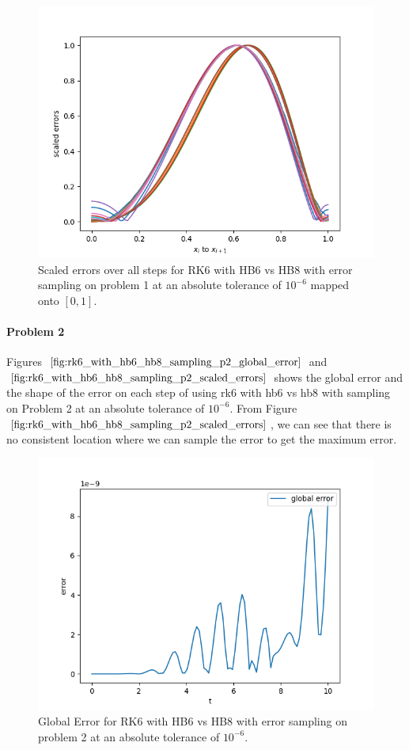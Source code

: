 \begin{figure}[H]
\centering
\includegraphics[width=0.7\linewidth]{./figures/rk6_with_hb6_hb8_sampling_p1_scaled_errors}
\caption{Scaled errors over all steps for RK6 with HB6 vs HB8 with error sampling on problem 1 at an absolute tolerance of $10^{-6}$ mapped onto $[0, 1]$.}
\label{fig:rk6_with_hb6_hb8_sampling_p1_scaled_errors}
\end{figure}

\paragraph{Problem 2} Figures $\ref{fig:rk6_with_hb6_hb8_sampling_p2_global_error}$ and $\ref{fig:rk6_with_hb6_hb8_sampling_p2_scaled_errors}$ shows the global error and the shape of the error on each step of using rk6 with hb6 vs hb8 with sampling on Problem 2 at an absolute tolerance of $10^{-6}$. From Figure $\ref{fig:rk6_with_hb6_hb8_sampling_p2_scaled_errors}$, we can see that there is no consistent location where we can sample the error to get the maximum error.

\begin{figure}[H]
\centering
\includegraphics[width=0.7\linewidth]{./figures/rk6_with_hb6_hb8_sampling_p2_global_error}
\caption{Global Error for RK6 with HB6 vs HB8 with error sampling on problem 2 at an absolute tolerance of $10^{-6}$.}
\label{fig:rk6_with_hb6_hb8_sampling_p2_global_error}
\end{figure}

